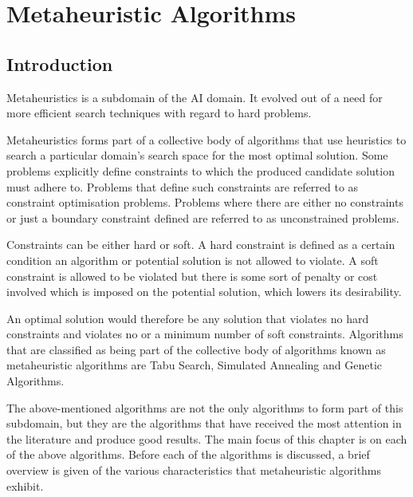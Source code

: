 \chapter{Metaheuristic Algorithms}
\label{chpt:heuristic}
\section{Introduction}
Metaheuristics is a subdomain of the \gls{AI} domain\cite{AIModernApproach}. It evolved out of a need for more efficient search techniques with regard to hard problems. 

Metaheuristics forms part of a collective body of algorithms that use heuristics to search a particular domain's search space for the most optimal solution\cite{AIModernApproach,NatureInspiredMetaHeuristic}. Some problems explicitly define constraints to which the produced candidate solution must adhere to. Problems that define such constraints are referred to as constraint optimisation problems\cite{FundamentalSwarm}. Problems where there are either no constraints or just a boundary constraint  defined are referred to as unconstrained problems\cite{FundamentalSwarm}.

Constraints can be either hard or soft. A hard constraint is defined as a certain condition an algorithm or potential solution is not allowed to violate\cite{AIModernApproach,NatureInspiredMetaHeuristic,Karen2004,Eisenblatter}. A soft constraint is allowed to be violated but there is some sort of penalty or cost involved which is imposed on the potential solution, which lowers its desirability\cite{AIModernApproach,NatureInspiredMetaHeuristic,Karen2004,Eisenblatter}. 

An optimal solution would therefore be any solution that violates no hard constraints and violates no or a minimum number of soft constraints\cite{AIModernApproach,NatureInspiredMetaHeuristic,Karen2004,Eisenblatter}. Algorithms that are classified as being part of the collective body of algorithms known as metaheuristic algorithms are Tabu Search\cite{TabuVechicleRoutingWithTimeWindows,TabuCSP}, Simulated Annealing \cite{SASingleMultiObj,CurveFittingSA} and Genetic Algorithms\cite{GATSP, GeostatisticalGA}.

The above-mentioned algorithms are not the only algorithms to form part of this subdomain, but they are the algorithms that have received the most attention in the literature and produce good results\cite{SweepMeta}.
The main focus of this chapter is on each of the above algorithms. Before each of the algorithms is discussed, a brief overview is given of the various characteristics that metaheuristic algorithms exhibit. 

